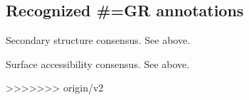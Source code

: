 \subsection{Recognized \#=GR annotations}

\begin{sreitems}{}
\item [\emcode{SS}]
	Secondary structure consensus. See  above.
\item [\emcode{SA}]
	Surface accessibility consensus. See  above.
\end{sreitems}


>>>>>>> origin/v2
